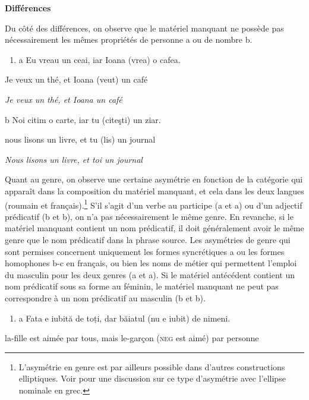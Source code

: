 \textbf{Différences} 

Du côté des différences, on observe que le matériel manquant ne possède pas nécessairement les mêmes propriétés de personne a ou de nombre b.


\begin{enumerate}
\item a  Eu vreau un ceai, iar Ioana (vrea) o cafea.


\end{enumerate}
Je veux un thé, et Ioana (veut) un café

{\itshape
Je veux un thé, et Ioana un café}

  b  Noi citim o carte, iar tu (citeşti) un ziar.

    nous lisons un livre, et tu (lis) un journal

{\itshape
Nous lisons un livre, et toi un journal}

Quant au genre, on observe une certaine asymétrie en fonction de la catégorie qui apparaît dans la composition du matériel manquant, et cela dans les deux langues (roumain et français).\footnote{L'asymétrie en genre est par ailleurs possible dans d'autres constructions elliptiques. Voir \citet{Merchant2011b} pour une discussion sur ce type d'asymétrie avec l'ellipse nominale en grec.} S'il s'agit d'un verbe au participe (a et a) ou d'un adjectif prédicatif (b et b), on n'a pas nécessairement le même genre. En revanche, si le matériel manquant contient un nom prédicatif, il doit généralement avoir le même genre que le nom prédicatif dans la phrase source. Les asymétries de genre qui sont permises concernent uniquement les formes syncrétiques a ou les formes homophones b-c en français, ou bien les noms de métier qui permettent l'emploi du masculin pour les deux genres (a et a). Si le matériel antécédent contient un nom prédicatif sous sa forme au féminin, le matériel manquant ne peut pas correspondre à un nom prédicatif au masculin (b et b). 


\begin{enumerate}
\item \label{bkm:Ref289299506}a  Fata e iubită de toți, dar băiatul (nu e iubit) de nimeni.


\end{enumerate}
la-fille est aimée par tous, mais le-garçon (\textsc{neg} est aimé) par personne

